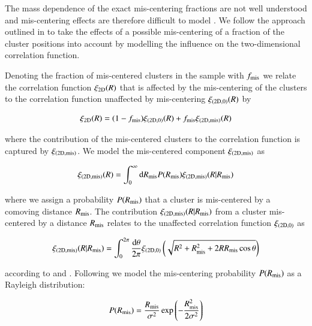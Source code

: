 \documentclass[iop, apjl, twocolappendix, numberedappendix]{emulateapj}
\begin{document}
The mass dependence of the exact mis-centering fractions are not
well understood and mis-centering effects are therefore difficult to model \citep{Skibba:2011, Hoshino:2015}. We follow the approach outlined in \citet{baxter2017halo} to take the effects of a possible mis-centering of a fraction of the cluster positions 
into account by modelling the influence on the two-dimensional correlation function.
 
Denoting the fraction of mis-centered clusters in the sample with $f_{\rm mis}$ we relate
the correlation function $\xi_{\rm 2D}(R)$ that is affected by the mis-centering of the clusters to the correlation function
unaffected by mis-centering $\xi_{\rm (2D,0)}(R)$ by

\begin{equation} 
\xi_{\rm 2D}(R) = (1-f_{\rm mis})\xi_{\rm (2D,0)}(R)+f_{\rm mis}\xi_{\rm (2D,mis)}(R)
\label{eq:full}
\end{equation}

where the contribution of the mis-centered clusters to the correlation function is captured by $\xi_{\rm (2D,mis)}$. 
We model the mis-centered component $\xi_{\rm (2D,mis)}$ as
 
\begin{equation}
\xi_{\rm (2D,mis)}(R)=\int_0^\infty \mathrm{d}R_{\rm mis} P(R_{\rm mis})\xi_{\rm (2D,mis)}(R|R_{\rm mis})
\end{equation}

where we assign a probability $P(R_{\rm mis})$ that a cluster is mis-centered by a comoving distance $R_{\rm mis}$.
The contribution $\xi_{\rm (2D,mis)}(R|R_{\rm mis})$ from a cluster mis-centered by a distance $R_{\rm mis}$ 
relates to the unaffected correlation function $\xi_{\rm (2D,0)}$ as

\begin{equation}
\xi_{\rm (2D,mis)}(R|R_{\rm mis})=\int_0^{2\pi}\frac{\mathrm{d}\theta}{2\pi}\xi_{\rm (2D,0)}\left(\sqrt{R^2+R_{\rm mis}^2+2RR_{\rm mis}\cos{\theta}}\right)
\end{equation}

according to \citet{yang2006weak} and \citet{johnston2007cross}. Following \citet{simet2016weak} we model the mis-centering probability 
$P(R_{\rm mis})$ as a Rayleigh distribution:

\begin{equation}
P(R_{\rm mis})=\frac{R_{\rm mis}}{\sigma^2}\exp{\left( -\frac{R_{\rm mis}^2}{2\sigma^2}\right)}
\end{equation}
\end{document}
